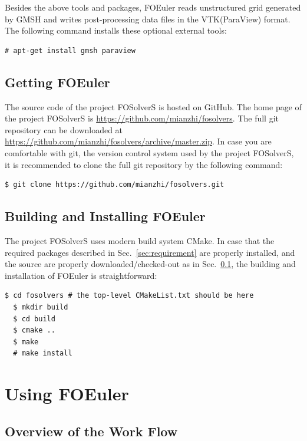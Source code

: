 \documentclass[]{article}
\begin{document}
Besides the above tools and packages, FOEuler reads unstructured grid generated by GMSH and writes
post-processing data files in the VTK(ParaView) format.
The following command installs these optional external tools:
\begin{lstlisting}[backgroundcolor=\color{lightgray}]
  # apt-get install gmsh paraview
\end{lstlisting}

\subsection{Getting FOEuler}
\label{sec:getting}

The source code of the project FOSolverS is hosted on GitHub.
The home page of the project FOSolverS is \url{https://github.com/mianzhi/fosolvers}.
The full git repository can be downloaded at \\
\url{https://github.com/mianzhi/fosolvers/archive/master.zip}.
In case you are comfortable with git, the version control system used by the project FOSolverS, it
is recommended to clone the full git repository by the following command:
\begin{lstlisting}[backgroundcolor=\color{lightgray}]
  $ git clone https://github.com/mianzhi/fosolvers.git
\end{lstlisting}

\subsection{Building and Installing FOEuler}

The project FOSolverS uses modern build system CMake.
In case that the required packages described in Sec.~\ref{sec:requirement} are properly installed,
and the source are properly downloaded/checked-out as in Sec.~\ref{sec:getting}, the building and
installation of FOEuler is straightforward:
\begin{lstlisting}[backgroundcolor=\color{lightgray}]
  $ cd fosolvers # the top-level CMakeList.txt should be here
  $ mkdir build
  $ cd build
  $ cmake ..
  $ make
  # make install
\end{lstlisting}

\section{Using FOEuler}

\subsection{Overview of the Work Flow}
\end{document}
